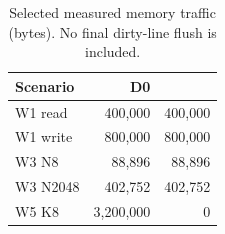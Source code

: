 \begin{table}[htbp]\centering\small
\caption{Selected measured memory traffic (bytes). No final dirty-line flush is included.}\label{tab:traffic}
\begin{tabular}{lrr}\toprule
Scenario & D0 & \dai{}\\\midrule
W1 read & 400,000 & 400,000\\
W1 write & 800,000 & 800,000\\
W3 N8 & 88,896 & 88,896\\
W3 N2048 & 402,752 & 402,752\\
W5 K8 & 3,200,000 & 0\\
\bottomrule\end{tabular}
\end{table}
